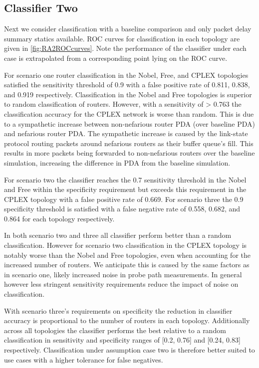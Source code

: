 \subsection{Classifier Two}
\label{ssec:Ras2}
Next we consider classification with a baseline comparison and only packet delay summary statics available. ROC curves for classification in each topology are given in \cref{fig:RA2ROCcurves}. Note the performance of the classifier under each case is extrapolated from a corresponding point lying on the ROC curve.\par
For scenario one router classification in the Nobel, Free, and CPLEX topologies satisfied the sensitivity threshold of 0.9 with a false positive rate of 0.811, 0.838, and 0.919 respectively. Classification in the Nobel and Free topologies is superior to random classification of routers. However, with a sensitivity of > 0.763 the classification accuracy for the CPLEX network is worse than random. This is due to a sympathetic increase between non-nefarious router PDA (over baseline PDA) and nefarious router PDA. The sympathetic increase is caused by the link-state protocol routing packets around nefarious routers as their buffer queue's fill. This results in more packets being forwarded to non-nefarious routers over the baseline simulation, increasing the difference in PDA from the baseline simulation.\par
For scenario two the classifier reaches the 0.7 sensitivity threshold in the Nobel and Free within the specificity requirement but exceeds this requirement in the CPLEX topology with a false positive rate of 0.669. For scenario three the 0.9 specificity threshold is satisfied with a false negative rate of 0.558, 0.682, and 0.864 for each topology respectively.\par
In both scenario two and three all classifier perform better than a random classification. However for scenario two classification in the CPLEX topology is notably worse than the Nobel and Free topologies, even when accounting for the increased number of routers. We anticipate this is caused by the same factors as in scenario one, likely increased noise in probe path measurements. In general however less stringent sensitivity requirements reduce the impact of noise on classification.\par
With scenario three's requirements on specificity the reduction in classifier accuracy is proportional to the number of routers in each topology. Additionally across all topologies the classifier performs the best relative to a random classification in sensitivity and specificity ranges of [0.2, 0.76] and [0.24, 0.83] respectively. Classification under assumption case two is therefore better suited to use cases with a higher tolerance for false negatives.\par
